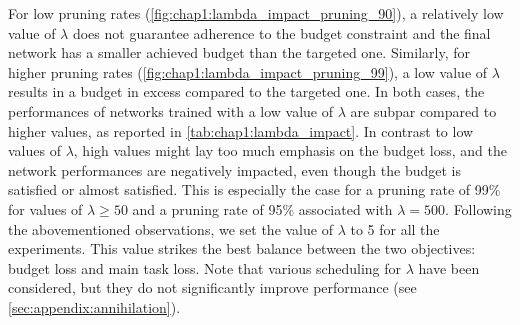 For low pruning rates (\cref{fig:chap1:lambda_impact_pruning_90}), a relatively
low value of $\lambda$ does not guarantee adherence to the budget constraint and
the final network has a smaller achieved budget than the targeted one.
Similarly, for higher pruning rates (\cref{fig:chap1:lambda_impact_pruning_99}),
a low value of $\lambda$ results in a budget in excess compared to the targeted
one. In both cases, the performances of networks trained with a low value of
$\lambda$ are subpar compared to higher values, as reported in
\cref{tab:chap1:lambda_impact}. In contrast to low values of $\lambda$, high
values might lay too much emphasis on the budget loss, and the network
performances are negatively impacted, even though the budget is satisfied or
almost satisfied. This is especially the case for a pruning rate of 99\% for
values of $\lambda \geq 50$ and a pruning rate of 95\% associated with
$\lambda=500$. Following the abovementioned observations, we set the value of
$\lambda$ to 5 for all the experiments. This value strikes the best balance
between the two objectives: budget loss and main task loss. Note that various
scheduling for $\lambda$ have been considered, but they do not significantly
improve performance (see \cref{sec:appendix:annihilation}).


